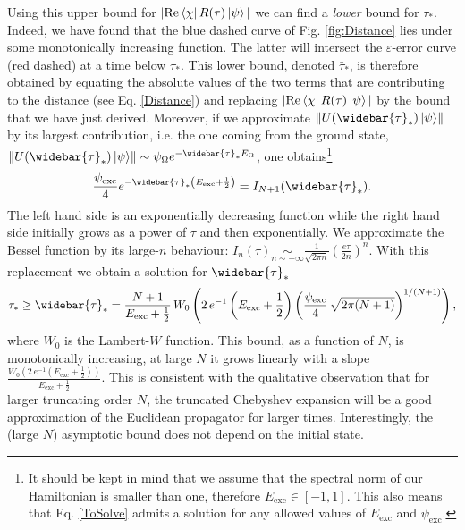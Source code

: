 \documentclass[a4paper,11pt]{article}
\begin{document}
Using this upper bound for $|\mathrm{Re}\bra{\chi}R(\tau)\ket{\psi}|$ we can find a \emph{lower} bound for $\tau_*$. Indeed, we have found that the blue dashed curve of Fig. \ref{fig:Distance} lies under some monotonically increasing function. The latter will intersect the $\varepsilon$-error curve (red dashed) at a time below $\tau_*$.  This lower bound, denoted $\bar{\tau}_*$, is therefore obtained by equating the absolute values of the two terms that are contributing to the distance (see Eq. \eqref{Distance}) and replacing $|\mathrm{Re}\bra{\chi}R(\tau)\ket{\psi}|$ by the bound that we have just derived. Moreover, if we approximate $\norm{U(\widebar{\tau}_*)\ket{\psi}}$ by its largest contribution, i.e. the one coming from the ground state, $\norm{U(\widebar{\tau}_*)\ket{\psi}}\sim \psi_\Omega e^{-\widebar{\tau}_* E_\Omega}$, one obtains\footnote{It should be kept in mind that we assume that the spectral norm of our Hamiltonian is smaller than one, therefore $E_{\mathrm{exc}}\in [-1,1]$. This also means that Eq. \eqref{ToSolve} admits a solution for any allowed values of $E_{\mathrm{exc}}$ and $\psi_{\mathrm{exc}}$.}
\begin{equation}
    \frac{\psi_{\mathrm{exc}}}{4}e^{-\widebar{\tau}_*\left(E_{\mathrm{exc}}+\frac{1}{2}\right)}=I_{N+1}(\widebar{\tau}_*).
    \label{ToSolve}
\end{equation}
The left hand side is an exponentially decreasing function while the right hand side initially grows as a power of $\tau$ and then exponentially. We approximate the Bessel function by its large-$n$ behaviour: $I_n(\tau)\underset{n\sim +\infty}{\sim}\frac{1}{\sqrt{2\pi n}}\left(\frac{e\tau}{2n}\right)^n$. With this replacement we obtain a solution for $\widebar{\tau}_*$
\begin{equation}
    \tau_*\geq\widebar{\tau}_* = \frac{N+1}{E_{\mathrm{exc}}+\frac{1}{2}}\,W_0\left(2\,e^{-1}\left(E_{\mathrm{exc}}+\frac{1}{2}\right)\left(\frac{\psi_{\mathrm{exc}}}{4}\,\sqrt{2\pi (N+1)}\right)^{1/(N+1)}\right),
\end{equation}
where $W_0$ is the Lambert-$W$ function. This bound, as a function of $N$, is monotonically increasing, at large $N$ it grows linearly with a slope $\frac{W_0\left(2\,e^{-1}\left(E_{\mathrm{exc}}+\frac{1}{2}\right)\right)}{E_{\mathrm{exc}}+\frac{1}{2}}$. This is consistent with the qualitative observation that for larger truncating order $N$, the truncated Chebyshev expansion will be a good approximation of the Euclidean propagator for larger times. Interestingly, the (large $N$) asymptotic bound does not depend on the initial state.
\end{document}
